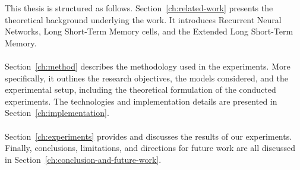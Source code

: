 This thesis is structured as follows. Section~\ref{ch:related-work} presents the theoretical background underlying the work. 
It introduces Recurrent Neural Networks, Long Short-Term Memory cells, and the Extended Long Short-Term Memory.
\\ \\ 
Section~\ref{ch:method} describes the methodology used in the experiments. More specifically, it outlines the research objectives, 
the models considered, and the experimental setup, including the theoretical formulation of the conducted experiments.
The technologies and implementation details are presented in Section~\ref{ch:implementation}.
\\ \\
Section~\ref{ch:experiments} provides and discusses the results of our experiments. Finally, conclusions, 
limitations, and directions for future work are all discussed in Section~\ref{ch:conclusion-and-future-work}.